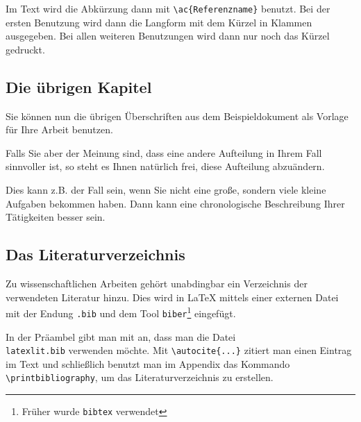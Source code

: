 \documentclass[pdftex,a4paper]{scrartcl}
\begin{document}
Im Text wird die Abkürzung dann mit \verb+\ac{Referenzname}+ benutzt.
Bei der ersten Benutzung wird dann die Langform mit dem Kürzel in Klammen 
ausgegeben. Bei allen weiteren Benutzungen wird dann nur noch das Kürzel gedruckt. 


\subsection{Die übrigen Kapitel}

Sie können nun die übrigen Überschriften aus dem Beispieldokument als Vorlage für Ihre Arbeit benutzen.

Falls Sie aber der Meinung sind, dass eine andere Aufteilung in Ihrem Fall sinnvoller ist, so steht es Ihnen natürlich frei, diese Aufteilung abzuändern.

Dies kann z.B. der Fall sein, wenn Sie nicht eine große, sondern viele kleine Aufgaben bekommen haben. Dann kann eine chronologische Beschreibung Ihrer Tätigkeiten besser sein.



\subsection{Das Literaturverzeichnis}

Zu wissenschaftlichen Arbeiten gehört unabdingbar ein Verzeichnis der verwendeten Literatur hinzu. Dies wird in \LaTeX{} mittels einer externen Datei mit der Endung \verb+.bib+ und dem Tool \verb+biber+\footnote{Früher wurde \texttt{bibtex} verwendet} eingefügt. 


In der Präambel gibt man mit \verb++ an, dass man die Datei \\\verb+latexlit.bib+ verwenden möchte. Mit  \verb+\autocite{...}+ zitiert man einen Eintrag im Text und schließlich benutzt man im Appendix das Kommando \verb+\printbibliography+, um das Literaturverzeichnis zu erstellen.
\end{document}
